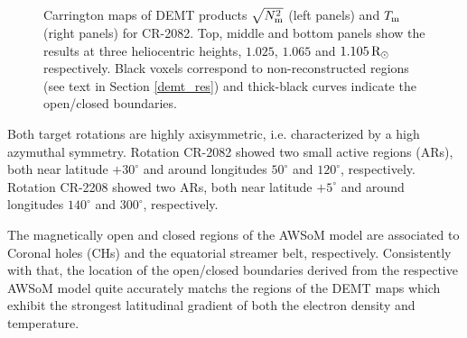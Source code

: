 \documentclass[namedreferences]{solarphysics}
\newcommand{\mdeg}{^\circ}
\newcommand{\mrsun}{{\rm R_\odot}}
\newcommand{\Tm}{T_{\rm m}}
\newcommand{\Nsqm}{N^2_{{\rm m}}}
\newcommand{\sqravgN}{\sqrt{\Nsqm}}
\begin{document}
\begin{article}
\begin{figure}[h!]
\begin{center}
\caption{Carrington maps of DEMT {products $\sqravgN$} (left panels) and $\Tm$ (right panels) for CR-2082. Top, middle and bottom panels show the results at three heliocentric heights, $1.025$, $1.065$ and $1.105\,\mrsun$ respectively. Black voxels correspond to non-reconstructed regions (see text in Section \ref{demt_res}) and thick-black curves indicate the open/closed boundaries.}
\label{carmaps_demt_2082}
\end{center}
\end{figure}

{Both target rotations are highly axisymmetric, i.e. characterized by a high azymuthal symmetry. Rotation CR-2082} showed two {small} active regions (ARs), both near latitude $+30\mdeg$ and {around longitudes} $50\mdeg$ and $120\mdeg${, respectively}. {Rotation CR-2208} showed two {ARs, both near latitude} $+5\mdeg$ and {around longitudes $140\mdeg$ and $300\mdeg$, respectively.} 

{The magnetically open and closed regions of the AWSoM model are associated to Coronal holes (CHs) and the equatorial streamer belt, respectively. Consistently with that, the {location of the} open/closed boundaries derived from the respective AWSoM model quite accurately matchs {the regions of the DEMT maps which exhibit the strongest latitudinal gradient of both the electron density and temperature.}}


\end{article}
\end{document}
